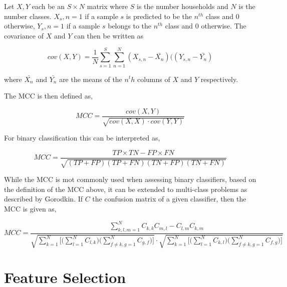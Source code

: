 Let $X,Y$ each be an $S\times N$ matrix where $S$ is the number households and $N$ is the number classes. $X_s,n=1$ if a sample $s$ is predicted to be the $n^{th}$ class and 0 otherwise, $Y_s,n=1$ if a sample $s$ belongs to the $n^{th}$ class and 0 otherwise. The covariance of $X$ and $Y$ can then be written as

\[cov(X,Y)=\frac{1}{N}\sum^S_{s=1}\sum^N_{n=1}(X_{s,n}-\bar{X_n})((Y_{s,n}-\bar{Y_n})\]

where $\bar{X_n}$ and $\bar{Y_n}$ are the means of the $n^th$ columns of $X$ and $Y$ respectively.

The MCC is then defined as,

\[MCC=\frac{cov(X,Y)}{\sqrt{cov(X,X)\cdot cov(Y,Y)}}\]


For binary classification this can be interpreted as,

\[MCC=\frac{TP\times TN-FP\times FN}{\sqrt{(TP+FP)(TP+FN)(TN+FP)(TN+FN)}}\]

While the MCC is mot commonly used when assessing binary classifiers, based on the definition of the MCC above, it can be extended to multi-class problems as described by Gorodkin\cite{Gorodkin}. If $C$ the confusion matrix of a given classifier, then the MCC is given as,

\[MCC=\frac{\sum\limits^N_{k,l,m=1}C_{k,k}C_{m,l}-C_{l,m}C_{k,m}}{\sqrt{\sum\limits^N_{k=1}\bigg[\bigg(\sum\limits^N_{l=1}C_{l,k}\bigg)\bigg(\sum\limits^N_{f\ne k,g=1}C_{g,f}\bigg)\bigg]}\cdot \sqrt{\sum\limits^N_{k=1}\bigg[\bigg(\sum\limits^N_{l=1}C_{k,l}\bigg)\bigg(\sum\limits^N_{f\ne k,g=1}C_{f,g}\bigg)\bigg]}}\] 


\section{Feature Selection}

